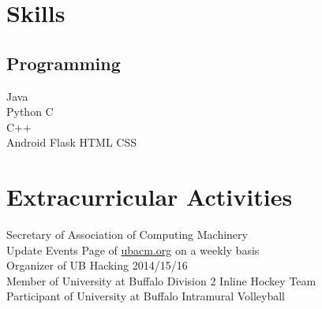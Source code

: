 \documentclass[letterpaper]{deedy-resume} %
\begin{document}
\begin{minipage}[t]{0.33\textwidth}
\section{Skills}

\subsection{Programming}

Java \\
Python \textbullet{} C \\
C++ \\
Android \textbullet{} Flask \textbullet{} HTML \textbullet{} CSS

\sectionspace %


\section{Extracurricular Activities} 

Secretary of Association of Computing Machinery \\
Update Events Page of \url{ubacm.org} on a weekly basis \\
Organizer of UB Hacking 2014/15/16 \\
Member of University at Buffalo Division 2 Inline Hockey Team \\
Participant of University at Buffalo Intramural Volleyball \\

\sectionspace %


\end{minipage} %
\hfill
%
%
\end{document}
